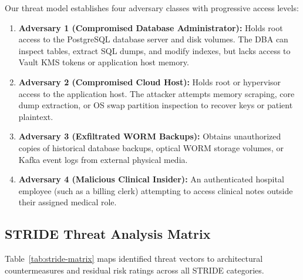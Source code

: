 Our threat model establishes four adversary classes with progressive access levels:
\begin{enumerate}
    \item \textbf{Adversary 1 (Compromised Database Administrator):} Holds root access to the PostgreSQL database server and disk volumes. The DBA can inspect tables, extract SQL dumps, and modify indexes, but lacks access to Vault KMS tokens or application host memory.

    \item \textbf{Adversary 2 (Compromised Cloud Host):} Holds root or hypervisor access to the application host. The attacker attempts memory scraping, core dump extraction, or OS swap partition inspection to recover keys or patient plaintext.

    \item \textbf{Adversary 3 (Exfiltrated WORM Backups):} Obtains unauthorized copies of historical database backups, optical WORM storage volumes, or Kafka event logs from external physical media.

    \item \textbf{Adversary 4 (Malicious Clinical Insider):} An authenticated hospital employee (such as a billing clerk) attempting to access clinical notes outside their assigned medical role.
\end{enumerate}

\subsection{STRIDE Threat Analysis Matrix}

Table~\ref{tab:stride-matrix} maps identified threat vectors to architectural countermeasures and residual risk ratings across all STRIDE categories.

